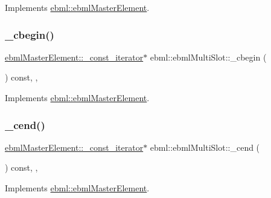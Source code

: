 Implements \mbox{\hyperlink{classebml_1_1ebmlMasterElement_af6fb7a9934e9b8d0c64273ef6944f44b}{ebml\+::ebml\+Master\+Element}}.

\mbox{\label{classebml_1_1ebmlMultiSlot_adf1816c367909a1d265f38419febf9c7}} 
\subsubsection{\texorpdfstring{\+\_\+cbegin()}{\_cbegin()}}
{\footnotesize\ttfamily \mbox{\hyperlink{classebml_1_1ebmlMasterElement_1_1__const__iterator}{ebml\+Master\+Element\+::\+\_\+const\+\_\+iterator}}$\ast$ ebml\+::ebml\+Multi\+Slot\+::\+\_\+cbegin (\begin{DoxyParamCaption}{ }\end{DoxyParamCaption}) const\hspace{0.3cm}{\ttfamily [override]}, {\ttfamily [protected]}, {\ttfamily [virtual]}}



Implements \mbox{\hyperlink{classebml_1_1ebmlMasterElement_a7e1ffa498e22b637a6671df14aa0bc45}{ebml\+::ebml\+Master\+Element}}.

\mbox{\label{classebml_1_1ebmlMultiSlot_a6bc62e4030734829022930e89e94278e}} 
\subsubsection{\texorpdfstring{\+\_\+cend()}{\_cend()}}
{\footnotesize\ttfamily \mbox{\hyperlink{classebml_1_1ebmlMasterElement_1_1__const__iterator}{ebml\+Master\+Element\+::\+\_\+const\+\_\+iterator}}$\ast$ ebml\+::ebml\+Multi\+Slot\+::\+\_\+cend (\begin{DoxyParamCaption}{ }\end{DoxyParamCaption}) const\hspace{0.3cm}{\ttfamily [override]}, {\ttfamily [protected]}, {\ttfamily [virtual]}}



Implements \mbox{\hyperlink{classebml_1_1ebmlMasterElement_ae6cdbf68d8267a7ab098bd402fa70e88}{ebml\+::ebml\+Master\+Element}}.

